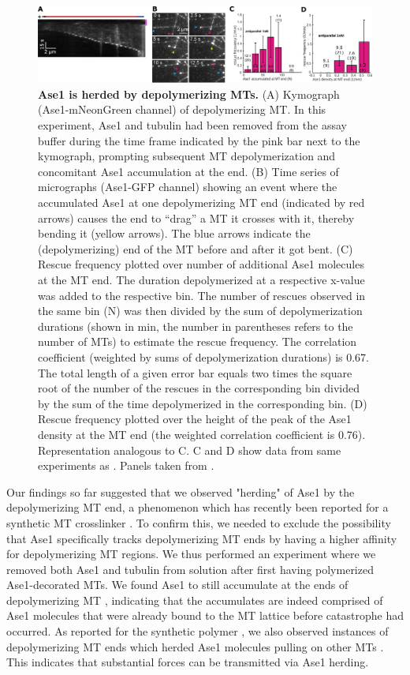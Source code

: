 \begin{figure}[h]
    \centering
    \includegraphics[width=1\linewidth]{Figures/ase2c.png}
    \caption[Ase1 is herded by depolymerizing MTs.]{\textbf{Ase1 is herded by depolymerizing MTs.}
    (A) Kymograph (Ase1-mNeonGreen channel) of depolymerizing MT. In this experiment, Ase1 and tubulin had been removed from the assay buffer during the time frame indicated by the pink bar next to the kymograph, prompting subsequent MT depolymerization and concomitant Ase1 accumulation at the end. (B) Time series of micrographs (Ase1-GFP channel) showing an event where the accumulated Ase1 at one depolymerizing MT end (indicated by red arrows) causes the end to “drag” a MT it crosses with it, thereby bending it (yellow arrows). The blue arrows indicate the (depolymerizing) end of the MT before and after it got bent. (C) Rescue frequency plotted over number of additional Ase1 molecules at the MT end. The duration depolymerized at a respective x-value was added to the respective bin. The number of rescues observed in the same bin (N) was then divided by the sum of depolymerization durations (shown in min, the number in parentheses refers to the number of MTs) to estimate the rescue frequency. The correlation coefficient (weighted \parencite{Pelletier2024} by sums of depolymerization durations) is 0.67. The total length of a given error bar equals two times the square root of the number of the rescues in the corresponding bin divided by the sum of the time depolymerized in the corresponding bin. (D) Rescue frequency plotted over the height of the peak of the Ase1 density at the MT end (the weighted correlation coefficient is 0.76). Representation analogous to C. C and D show data from same experiments as . Panels taken from \cite{Krattenmacher2024}.
        }\label{ase2c}
\end{figure}

Our findings so far suggested that we observed "herding" of Ase1 by the depolymerizing MT end, a phenomenon which has recently been reported for a synthetic MT crosslinker \parencite{Drechsler2019}. To confirm this, we needed to exclude the possibility that Ase1 specifically tracks depolymerizing MT ends by having a higher affinity for depolymerizing MT regions. We thus performed an experiment where we removed both Ase1 and tubulin from solution after first having polymerized Ase1-decorated MTs. We found Ase1 to still accumulate at the ends of depolymerizing MT , indicating that the accumulates are indeed comprised of Ase1 molecules that were already bound to the MT lattice before catastrophe had occurred. As reported for the synthetic polymer \parencite{Drechsler2019}, we also observed instances of depolymerizing MT ends which herded Ase1 molecules pulling on other MTs . This indicates that substantial forces can be transmitted via Ase1 herding.\par

